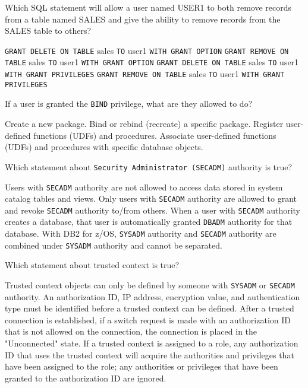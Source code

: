 \documentclass[11pt]{exam}
\begin{document}
\begin{questions}
\question[1]
Which SQL statement will allow a user named USER1 to both remove records from a table named
SALES and give the ability to remove records from the SALES table to others?
\begin{choices}
\choice \texttt{GRANT DELETE ON TABLE} sales \texttt{TO} user1 \texttt{WITH GRANT OPTION}
\choice \texttt{GRANT REMOVE ON TABLE} sales \texttt{TO} user1 \texttt{WITH GRANT OPTION}
\choice \texttt{GRANT DELETE ON TABLE} sales \texttt{TO} user1 \texttt{WITH GRANT PRIVILEGES}
\choice \texttt{GRANT REMOVE ON TABLE} sales \texttt{TO} user1 \texttt{WITH GRANT PRIVILEGES}
\end{choices}

\newpage

\question[1]
If a user is granted the \texttt{BIND} privilege, what are they allowed to do?
\begin{choices}
\choice Create a new package.
\choice Bind or rebind (recreate) a specific package.
\choice Register user-defined functions (UDFs) and procedures.
\choice Associate user-defined functions (UDFs) and procedures with specific database objects.
\end{choices}

\question[1]
Which statement about \texttt{Security Administrator (SECADM)} authority is true?
\begin{choices}
\choice Users with \texttt{SECADM} authority are not allowed to access data stored in system 
catalog tables and views.
\choice Only users with \texttt{SECADM} authority are allowed to grant and revoke \texttt{SECADM}
authority to/from others.
\choice When a user with \texttt{SECADM} authority creates a database, that user is automatically granted
\texttt{DBADM} authority for that database.
\choice With DB2 for z/OS, \texttt{SYSADM} authority and \texttt{SECADM} authority are combined under
\texttt{SYSADM} authority and cannot be separated.
\end{choices}

\question[1]
Which statement about trusted context is true?
\begin{choices}
\choice Trusted context objects can only be defined by someone with \texttt{SYSADM} or \texttt{SECADM}
authority.
\choice An authorization ID, IP address, encryption value, and authentication type must be identified
before a trusted context can be defined.
\choice After a trusted connection is established, if a switch request is made with an authorization ID
that is not allowed on the connection, the connection is placed in the "Unconnected" state.
\choice If a trusted context is assigned to a role, any authorization ID that uses the trusted context
will acquire the authorities and privileges that have been assigned to the role; any authorities or
privileges that have been granted to the authorization ID are ignored.
\end{choices}


\end{questions}
\end{document}
